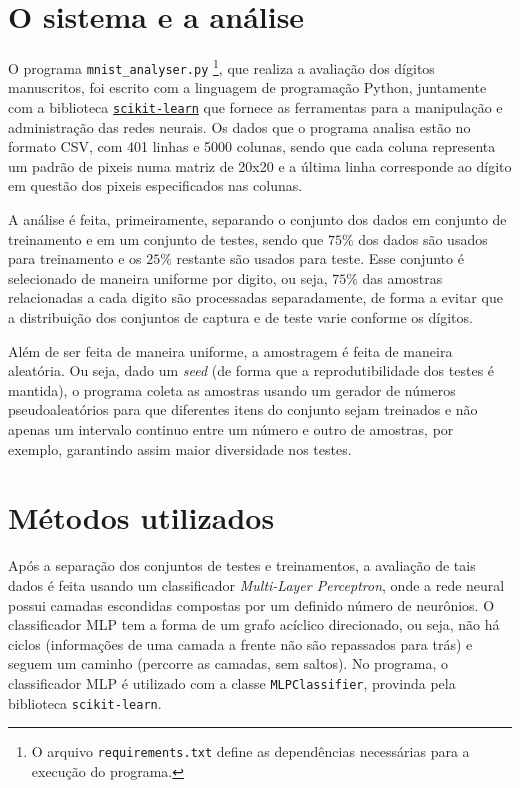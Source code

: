 \documentclass{article}
\begin{document}
    \section*{O sistema e a análise}
        O programa \texttt{mnist\_analyser.py} \footnote{O arquivo
        \texttt{requirements.txt} define as dependências necessárias para a
        execução do programa.}, que realiza a avaliação dos dígitos
        manuscritos, foi escrito com a linguagem de programação Python,
        juntamente com a biblioteca
        \href{http://scikit-learn.org/stable/index.html}{\texttt{scikit-learn}}
        que fornece as ferramentas para a manipulação e administração das redes
        neurais. Os dados que o programa analisa estão no formato CSV, com 401
        linhas e 5000 colunas, sendo que cada coluna representa um padrão de
        pixeis numa matriz de 20x20 e a última linha corresponde ao dígito em
        questão dos pixeis especificados nas colunas.
        
        A análise é feita, primeiramente, separando o conjunto dos dados em
        conjunto de treinamento e em um conjunto de testes, sendo que $75\%$
        dos dados são usados para treinamento e os $25\%$ restante são usados
        para teste. Esse conjunto é selecionado de maneira uniforme por digito,
        ou seja, $75\%$ das amostras relacionadas a cada digito são processadas
        separadamente, de forma a evitar que a distribuição dos conjuntos de
        captura e de teste varie conforme os dígitos.
        
        Além de ser feita de maneira uniforme, a amostragem é feita de maneira
        aleatória. Ou seja, dado um \textit{seed} (de forma que a
        reprodutibilidade dos testes é mantida), o programa coleta as amostras
        usando um gerador de números pseudoaleatórios para que diferentes itens
        do conjunto sejam treinados e não apenas um intervalo continuo entre um
        número e outro de amostras, por exemplo, garantindo assim maior
        diversidade nos testes.
    
    \section*{Métodos utilizados}
        Após a separação dos conjuntos de testes e treinamentos, a avaliação de
        tais dados é feita usando um classificador \textit{Multi-Layer
        Perceptron}, onde a rede neural possui camadas escondidas compostas por
        um definido número de neurônios. O classificador MLP tem a forma de um
        grafo acíclico direcionado, ou seja, não há ciclos (informações de uma
        camada a frente não são repassados para trás) e seguem um caminho
        (percorre as camadas, sem saltos). No programa, o classificador MLP é
        utilizado com a classe \texttt{MLPClassifier}, provinda pela biblioteca
        \texttt{scikit-learn}.
        
\end{document}
